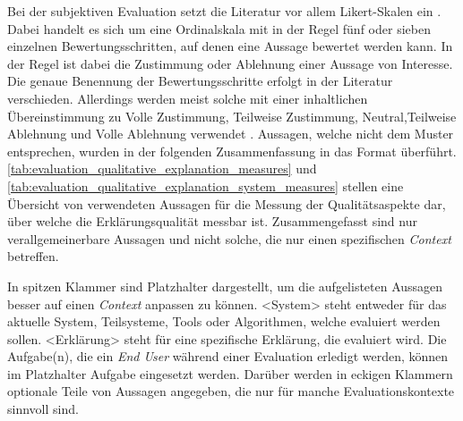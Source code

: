 \bigskip

Bei der subjektiven Evaluation setzt die Literatur vor allem Likert-Skalen ein \cite{sato_action-triggering_2019, sato_context_nodate, wang_is_2018}. Dabei handelt es sich um eine Ordinalskala mit in der Regel fünf oder sieben einzelnen Bewertungsschritten, auf denen eine Aussage bewertet werden kann. In der Regel ist dabei die Zustimmung oder Ablehnung einer Aussage von Interesse. Die genaue Benennung der Bewertungsschritte erfolgt in der Literatur verschieden. Allerdings werden meist solche mit einer inhaltlichen Übereinstimmung zu \glqq Volle Zustimmung\grqq{}, \glqq Teilweise Zustimmung\grqq{}, \glqq Neutral\grqq{},\glqq Teilweise Ablehnung\grqq{} und \glqq Volle Ablehnung\grqq{} verwendet \cite{hoffman_metrics_nodate, koo_understanding_2016, koo_why_2015, hernandez-bocanegra_effects_2020}. Aussagen, welche nicht dem Muster entsprechen, wurden in der folgenden Zusammenfassung in das Format überführt. \autoref{tab:evaluation_qualitative_explanation_measures} und \autoref{tab:evaluation_qualitative_explanation_system_measures} stellen eine Übersicht von verwendeten Aussagen für die Messung der Qualitätsaspekte dar, über welche die Erklärungsqualität messbar ist. Zusammengefasst sind nur verallgemeinerbare Aussagen und nicht solche, die nur einen spezifischen \textit{Context} betreffen.

In spitzen Klammer sind Platzhalter dargestellt, um die aufgelisteten Aussagen besser auf einen \textit{Context} anpassen zu können. \glqq <System>\grqq{} steht entweder für das aktuelle System, Teilsysteme, Tools oder Algorithmen, welche evaluiert werden sollen. \glqq <Erklärung>\grqq{} steht für eine spezifische Erklärung, die evaluiert wird. Die Aufgabe(n), die ein \textit{End User} während einer Evaluation erledigt werden, können im Platzhalter \glqq Aufgabe\grqq{} eingesetzt werden. Darüber werden in eckigen Klammern optionale Teile von Aussagen angegeben, die nur für manche Evaluationskontexte sinnvoll sind.

